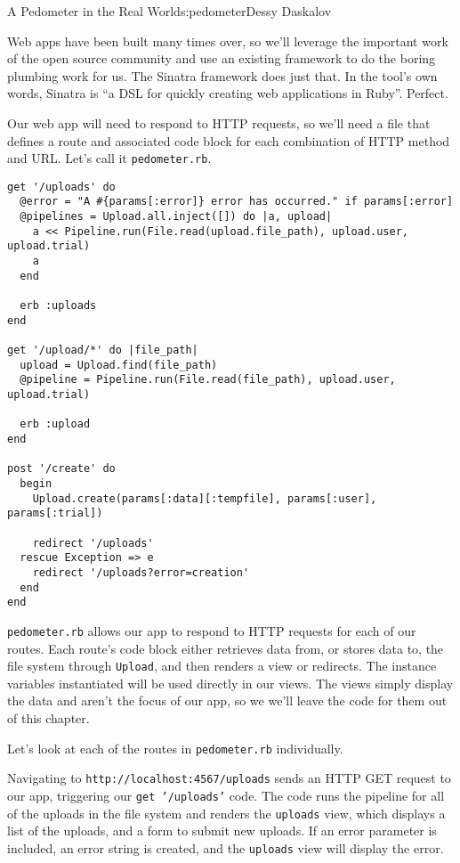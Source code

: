 \begin{aosachapter}{A Pedometer in the Real World}{s:pedometer}{Dessy Daskalov}
\label{building-a-web-application}

Web apps have been built many times over, so we'll leverage the
important work of the open source community and use an existing
framework to do the boring plumbing work for us. The Sinatra framework
does just that. In the tool's own words, Sinatra is ``a DSL for quickly
creating web applications in Ruby''. Perfect.

Our web app will need to respond to HTTP requests, so we'll need a file
that defines a route and associated code block for each combination of
HTTP method and URL. Let's call it \texttt{pedometer.rb}.

\begin{verbatim}
get '/uploads' do
  @error = "A #{params[:error]} error has occurred." if params[:error]
  @pipelines = Upload.all.inject([]) do |a, upload|
    a << Pipeline.run(File.read(upload.file_path), upload.user, upload.trial)
    a
  end

  erb :uploads
end

get '/upload/*' do |file_path|
  upload = Upload.find(file_path)
  @pipeline = Pipeline.run(File.read(file_path), upload.user, upload.trial)

  erb :upload
end

post '/create' do
  begin
    Upload.create(params[:data][:tempfile], params[:user], params[:trial])

    redirect '/uploads'
  rescue Exception => e
    redirect '/uploads?error=creation'
  end
end
\end{verbatim}

\texttt{pedometer.rb} allows our app to respond to HTTP requests for
each of our routes. Each route's code block either retrieves data from,
or stores data to, the file system through \texttt{Upload}, and then
renders a view or redirects. The instance variables instantiated will be
used directly in our views. The views simply display the data and aren't
the focus of our app, so we we'll leave the code for them out of this
chapter.

Let's look at each of the routes in \texttt{pedometer.rb} individually.

\label{get-uploads}

Navigating to \texttt{http://localhost:4567/uploads} sends an HTTP GET
request to our app, triggering our \texttt{get '/uploads'} code. The
code runs the pipeline for all of the uploads in the file system and
renders the \texttt{uploads} view, which displays a list of the uploads,
and a form to submit new uploads. If an error parameter is included, an
error string is created, and the \texttt{uploads} view will display the
error.


\end{aosachapter}
